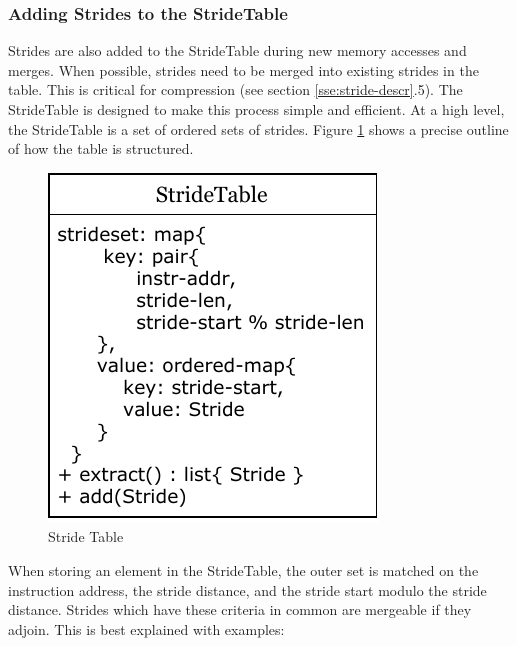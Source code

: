 \documentclass[12pt,twoside]{reedthesis}
\begin{document}
			
			
		
		\subsubsection{Adding Strides to the StrideTable}
			
			Strides are also added to the StrideTable during new memory accesses and merges. 			
			When possible, strides need to be merged into existing strides in the table. This is critical for compression (see section \ref{sse:stride-descr}.5). The StrideTable is designed to make this process simple and efficient. 
			At a high level, the StrideTable is a set of ordered sets of strides. 
			Figure \ref{fig:stride-table} shows a precise outline of how the table is structured.  %
			
			\begin{figure}[h]
				\caption{Stride Table}
				\label{fig:stride-table}
				\includegraphics[scale=1.0]{stride_data.pdf}
			\end{figure}
			 
			
			When storing an element in the StrideTable, the outer set is matched on the instruction address, the stride distance, and the stride start modulo the stride distance. Strides which have these criteria in common are mergeable if they adjoin.  This is best explained with examples:
			
\end{document}
